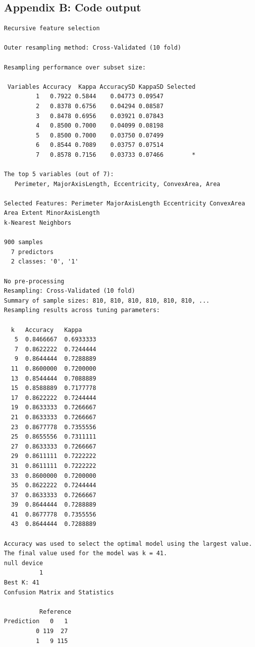 \documentclass{article}
\begin{document}
\begin{thebibliography}{9}
\section*{Appendix B: Code output}
\label{sec:appendixB}

\begin{verbatim}
Recursive feature selection

Outer resampling method: Cross-Validated (10 fold) 

Resampling performance over subset size:

 Variables Accuracy  Kappa AccuracySD KappaSD Selected
         1   0.7922 0.5844    0.04773 0.09547         
         2   0.8378 0.6756    0.04294 0.08587         
         3   0.8478 0.6956    0.03921 0.07843         
         4   0.8500 0.7000    0.04099 0.08198         
         5   0.8500 0.7000    0.03750 0.07499         
         6   0.8544 0.7089    0.03757 0.07514         
         7   0.8578 0.7156    0.03733 0.07466        *

The top 5 variables (out of 7):
   Perimeter, MajorAxisLength, Eccentricity, ConvexArea, Area

Selected Features: Perimeter MajorAxisLength Eccentricity ConvexArea Area Extent MinorAxisLength 
k-Nearest Neighbors 

900 samples
  7 predictors
  2 classes: '0', '1' 

No pre-processing
Resampling: Cross-Validated (10 fold) 
Summary of sample sizes: 810, 810, 810, 810, 810, 810, ... 
Resampling results across tuning parameters:

  k   Accuracy   Kappa    
   5  0.8466667  0.6933333
   7  0.8622222  0.7244444
   9  0.8644444  0.7288889
  11  0.8600000  0.7200000
  13  0.8544444  0.7088889
  15  0.8588889  0.7177778
  17  0.8622222  0.7244444
  19  0.8633333  0.7266667
  21  0.8633333  0.7266667
  23  0.8677778  0.7355556
  25  0.8655556  0.7311111
  27  0.8633333  0.7266667
  29  0.8611111  0.7222222
  31  0.8611111  0.7222222
  33  0.8600000  0.7200000
  35  0.8622222  0.7244444
  37  0.8633333  0.7266667
  39  0.8644444  0.7288889
  41  0.8677778  0.7355556
  43  0.8644444  0.7288889

Accuracy was used to select the optimal model using the largest value.
The final value used for the model was k = 41.
null device 
          1 
Best K: 41 
Confusion Matrix and Statistics

          Reference
Prediction   0   1
         0 119  27
         1   9 115
                                          

\end{verbatim}
\end{thebibliography}
\end{document}
